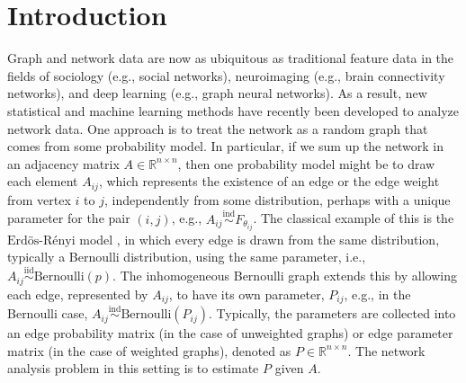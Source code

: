 \documentclass[12pt]{article}
\begin{document}
\newcommand{\diag}{\mathrm{diag}}
\newcommand{\tr}{\mathrm{Tr}}
\newcommand{\blockdiag}{\mathrm{blockdiag}}
\newcommand{\indep}{\stackrel{\mathrm{ind}}{\sim}}
\newcommand{\iid}{\stackrel{\mathrm{iid}}{\sim}}
\newcommand{\Bernoulli}{\mathrm{Bernoulli}}
\newcommand{\Betadist}{\mathrm{Beta}}
\newcommand{\BG}{\mathrm{BernoulliGraph}}
\newcommand{\Uniform}{\mathrm{Uniform}}
\newcommand{\PABM}{\mathrm{PABM}}
\newcommand{\RDPG}{\mathrm{RDPG}}
\newcommand{\GRDPG}{\mathrm{GRDPG}}
\newcommand{\Multinomial}{\mathrm{Multinomial}}
\newcommand{\Categorical}{\mathrm{Categorical}}
\newcommand{\dd}{\mathrm{d}}
\newcommand{\as}{\stackrel{\mathrm{a.s.}}{\to}}
\newcommand{\ER}{\text{Erd\"{o}s-R\'{e}nyi}}
\newcommand{\SBM}{\mathrm{SBM}}
\newcommand{\DCBM}{\mathrm{DCBM}}
\newcommand{\rank}{\mathrm{rank}}
\newcommand{\MBM}{\mathrm{MBM}}
\newcommand{\LSM}{\mathrm{LSM}}
\newcommand{\MLSM}{\mathrm{MLSM}}
\newcommand{\Poisson}{\mathrm{Poisson}}
\newtheorem{theorem}{Theorem}
\newtheorem{lemma}{Lemma}
\newtheorem{corollary}{Corollary}
\newtheorem{proposition}{Proposition}
\theoremstyle{remark}
\newtheorem{remark}{Remark}
\theoremstyle{definition}
\newtheorem{definition}{Definition}
\newtheorem{example}{Example}

\section{Introduction}\label{introduction}

Graph and network data are now as ubiquitous as traditional feature data
in the fields of sociology (e.g., social networks), neuroimaging (e.g.,
brain connectivity networks), and deep learning (e.g., graph neural
networks). As a result, new statistical and machine learning methods
have recently been developed to analyze network data. One approach is to
treat the network as a random graph that comes from some probability
model. In particular, if we sum up the network in an adjacency matrix
\(A \in \mathbb{R}^{n \times n}\), then one probability model might be
to draw each element \(A_{ij}\), which represents the existence of an
edge or the edge weight from vertex \(i\) to \(j\), independently from
some distribution, perhaps with a unique parameter for the pair
\((i,j)\), e.g., \(A_{ij} \indep F_{\theta_{ij}}\). The classical
example of this is the \(\ER\) model \citep{Gilbert:1959}, in which
every edge is drawn from the same distribution, typically a Bernoulli
distribution, using the same parameter, i.e.,
\(A_{ij} \iid \Bernoulli (p)\). The inhomogeneous Bernoulli graph
extends this by allowing each edge, represented by \(A_{ij}\), to have
its own parameter, \(P_{ij}\), e.g., in the Bernoulli case,
\(A_{ij} \indep \Bernoulli(P_{ij})\). Typically, the parameters are
collected into an edge probability matrix (in the case of unweighted
graphs) or edge parameter matrix (in the case of weighted graphs),
denoted as \(P \in \mathbb{R}^{n \times n}\). The network analysis
problem in this setting is to estimate \(P\) given \(A\).
\end{document}
